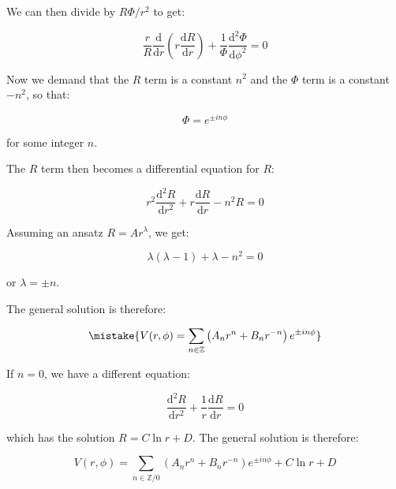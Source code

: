 \documentclass[12pt]{article}
\begin{document}
We can then divide by $R\Phi/r^{2}$ to get:

\begin{equation}
    \frac{r}{R} \frac{\mathrm{d}}{\mathrm{d}r} \left( r \frac{\mathrm{d}R}{\mathrm{d}r} \right) + \frac{1}{\Phi} \frac{\mathrm{d}^{2}\Phi}{\mathrm{d}\phi^{2}} = 0
\end{equation}

Now we demand that the $R$ term is a constant $n^{2}$ and the $\Phi$ term is a constant $-n^{2}$, so that:

\begin{equation}
    \Phi = e^{\pm in\phi}
\end{equation}

for some integer $n$.

The $R$ term then becomes a differential equation for $R$:

\begin{equation}
    r^{2} \frac{\mathrm{d}^{2}R}{\mathrm{d}r^{2}} + r \frac{\mathrm{d}R}{\mathrm{d}r} - n^{2} R = 0
\end{equation}

Assuming an ansatz $R = Ar^{\lambda}$, we get:

\begin{equation}
    \lambda(\lambda - 1) + \lambda - n^{2} = 0
\end{equation}

or $\lambda = \pm n$.

The general solution is therefore:

\begin{equation}
    \mistake{V(r, \phi) = \sum_{n \in \mathbb{Z}} \left( A_{n} r^{n} + B_{n} r^{-n} \right) e^{\pm in\phi}}
\end{equation}

\begin{correction}
    If $n = 0$, we have a different equation:

    \begin{equation}
        \frac{\mathrm{d}^{2}R}{\mathrm{d}r^{2}} + \frac{1}{r} \frac{\mathrm{d}R}{\mathrm{d}r} = 0
    \end{equation}

    which has the solution $R = C\ln{r} + D$. The general solution is therefore:

    \begin{equation}
        V(r, \phi) = \sum_{n \in \mathbb{Z}/0} \left( A_{n} r^{n} + B_{n} r^{-n} \right) e^{\pm in\phi} + C\ln{r} + D
    \end{equation}
\end{correction}
\end{document}
